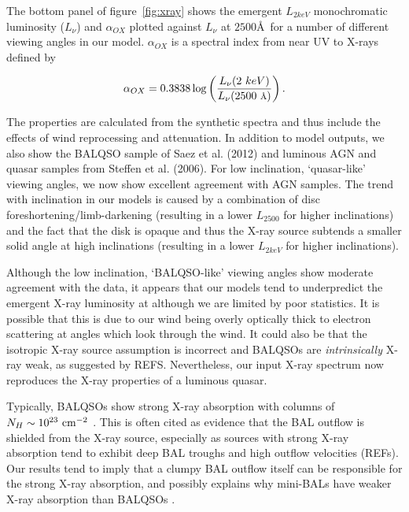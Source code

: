 \documentclass[preprint, a4paper, 11pt]{aastex}
\begin{document}
The bottom panel of figure~\ref{fig:xray} shows the emergent $L_{2keV}$ 
monochromatic luminosity ($L_\nu$) and $\alpha_{OX}$ plotted against 
$L_\nu$ at $2500$\AA\ for a number of different viewing angles in our model.
$\alpha_{OX}$ is a spectral index from near UV to X-rays defined by

\begin{equation}
\alpha_{OX}=0.3838\log\left(\frac{L_{\nu}(2~keV)}{L_{\nu}(2500~\mbox{\scriptsize{\AA}})}\right).
\end{equation}

The properties are calculated from the synthetic spectra and thus include
the effects of wind reprocessing and attenuation. In addition to model outputs,
we also show the BALQSO sample of Saez et al. (2012) and luminous AGN and quasar
samples from Steffen et al. (2006). For low inclination, `quasar-like' viewing angles,
we now show excellent agreement with AGN samples. The trend with inclination
in our models is caused by a combination of disc foreshortening/limb-darkening 
(resulting in a lower $L_{2500}$ for higher inclinations) and the fact that the disk 
is opaque and thus the X-ray source subtends a smaller solid angle at high inclinations
(resulting in a lower $L_{2keV}$ for higher inclinations). 

Although the low inclination, `BALQSO-like' viewing angles show moderate agreement with the data,
it appears that our models tend to underpredict the emergent X-ray luminosity at 
although we are limited by poor statistics. 
It is possible that this is due to our wind being overly optically thick to 
electron scattering at angles which look through the wind. It could also be that the
isotropic X-ray source assumption is incorrect and BALQSOs are {\em intrinsically} 
X-ray weak, as suggested by REFS. Nevertheless, our input X-ray spectrum
now reproduces the X-ray properties of a luminous quasar.

Typically, BALQSOs show strong X-ray absorption with columns 
of $N_H\sim10^{23}~\rm{cm^{-2}}$ 
\citep{green1996,brandt2000,mathur2000,green2001,grupemathur2003}.
This is often cited as evidence that the BAL outflow is shielded from
the X-ray source, especially as sources with strong X-ray absorption tend
to exhibit deep BAL troughs and high outflow velocities (REFs).
Our results tend to imply that a clumpy BAL outflow
itself can be responsible for the strong X-ray absorption, and possibly 
explains why mini-BALs have weaker X-ray absorption than BALQSOs 
\citep[e.g.][]{brandt2000,hamann2013}.
\end{document}

